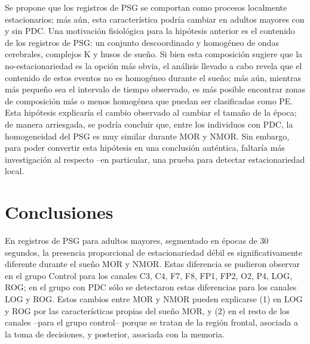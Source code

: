 \documentclass[12pt,a4paper]{mitthesis}
\begin{document}
Se propone que los registros de PSG se comportan como procesos localmente estacionarios; m\'as 
a\'un, esta caracter\'istica podr\'ia cambiar en adultos mayores con y sin PDC. 
Una motivaci\'on fisiol\'ogica para la hip\'otesis anterior es el contenido de los registros de
PSG: un conjunto descoordinado y homog\'eneo de ondas cerebrales, complejos K y husos de sue\~no.
Si bien esta composici\'on sugiere que la no-estacionariedad es la opci\'on m\'as obvia, el
an\'alisis llevado a cabo revela que el contenido de estos eventos no es homog\'eneo durante el
sue\~no; m\'as a\'un, mientras m\'as peque\~no sea el intervalo de tiempo observado, es m\'as
posible encontrar zonas de composici\'on m\'as o menos homog\'enea que puedan ser clasificadas
como PE.
Esta hip\'otesis explicar\'ia el cambio observado al cambiar el tama\~no de la \'epoca; de manera
arriesgada, se podr\'ia concluir que, entre los individuos con PDC, la homogeneidad del PSG es muy
similar durante MOR y NMOR.
Sin embargo, para poder convertir esta hip\'otesis en una conclusi\'on aut\'entica, faltar\'ia
m\'as investigaci\'on al respecto --en particular, una prueba para detectar estacionariedad local.


\section{Conclusiones}

En registros de PSG para adultos mayores, segmentado en \'epocas de 30 segundos, la presencia 
proporcional de estacionariedad d\'ebil es significativamente diferente durante el sue\~no MOR y NMOR.
Estas diferencia se pudieron observar en el grupo Control para los canales C3, C4, F7, F8, FP1, 
FP2, O2, P4, LOG, ROG; en el grupo con PDC s\'olo se detectaron estas diferencias para los canales 
LOG y ROG.
Estos cambios entre MOR y NMOR pueden explicarse (1) en LOG y ROG por las caracter\'isticas propias 
del sue\~no MOR, y (2) en el resto de los canales --para el grupo control-- porque se tratan de la 
regi\'on frontal, asociada a la toma de decisiones, y posterior, asociada con la memoria.

\end{document}
